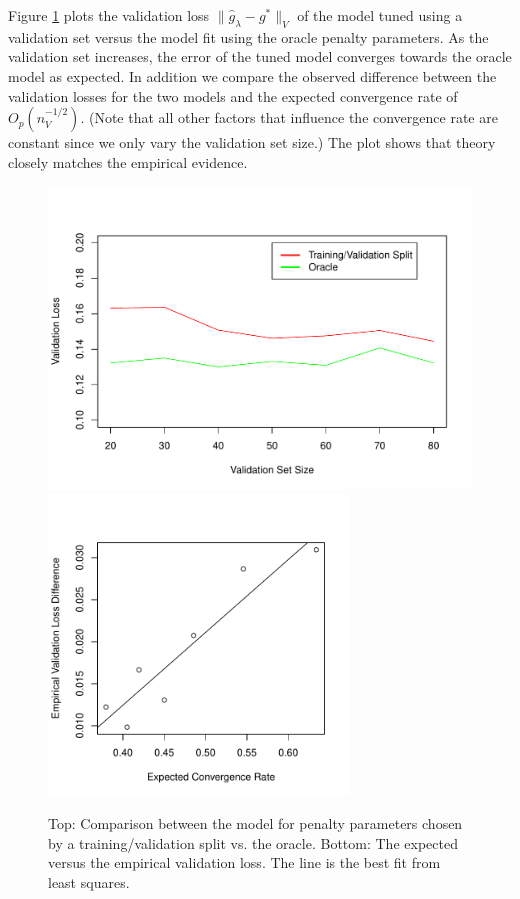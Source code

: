 \documentclass[12pt]{article}
\begin{document}
Figure \ref{fig:emp_v_theory} plots the validation loss $\| \hat{g}_{\lambda} - g^* \|_V$ of the model tuned using a validation set versus the model fit using the oracle penalty parameters. As the validation set increases, the error of the tuned model converges towards the oracle model as expected. In addition we compare the observed difference between the validation losses for the two models and the expected convergence rate of $O_p\left (n_{V}^{-1/2} \right)$. (Note that all other factors that influence the convergence rate are constant since we only vary the validation set size.) The plot shows that theory closely matches the empirical evidence.

\begin{figure}
\label{fig:emp_v_theory}
\caption{Top: Comparison between the model for penalty parameters chosen by a training/validation split vs. the oracle. Bottom: The expected versus the empirical validation loss. The line is the best fit from least squares.}
\centering
\includegraphics[height=80mm]{../R/figures/validation_size_loss.pdf}
\includegraphics[height=80mm]{../R/figures/qqplot.pdf}
\end{figure}
\end{document}
